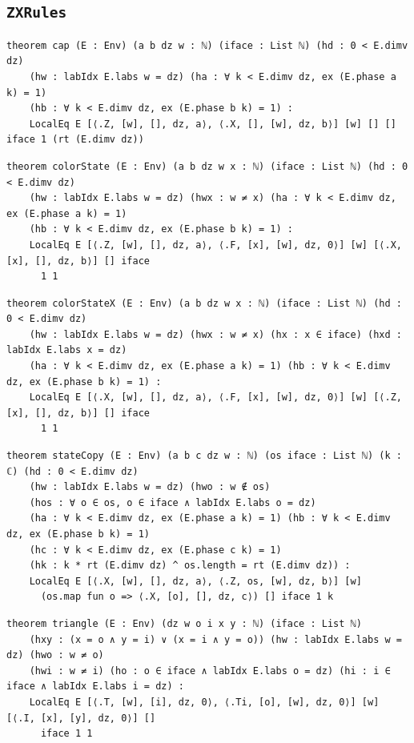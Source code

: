 \subsection{\texttt{ZXRules}}
\begin{lstlisting}[style=leancore]
theorem cap (E : Env) (a b dz w : ℕ) (iface : List ℕ) (hd : 0 < E.dimv dz)
    (hw : labIdx E.labs w = dz) (ha : ∀ k < E.dimv dz, ex (E.phase a k) = 1)
    (hb : ∀ k < E.dimv dz, ex (E.phase b k) = 1) :
    LocalEq E [⟨.Z, [w], [], dz, a⟩, ⟨.X, [], [w], dz, b⟩] [w] [] [] iface 1 (rt (E.dimv dz))
\end{lstlisting}
\begin{lstlisting}[style=leancore]
theorem colorState (E : Env) (a b dz w x : ℕ) (iface : List ℕ) (hd : 0 < E.dimv dz)
    (hw : labIdx E.labs w = dz) (hwx : w ≠ x) (ha : ∀ k < E.dimv dz, ex (E.phase a k) = 1)
    (hb : ∀ k < E.dimv dz, ex (E.phase b k) = 1) :
    LocalEq E [⟨.Z, [w], [], dz, a⟩, ⟨.F, [x], [w], dz, 0⟩] [w] [⟨.X, [x], [], dz, b⟩] [] iface
      1 1
\end{lstlisting}
\begin{lstlisting}[style=leancore]
theorem colorStateX (E : Env) (a b dz w x : ℕ) (iface : List ℕ) (hd : 0 < E.dimv dz)
    (hw : labIdx E.labs w = dz) (hwx : w ≠ x) (hx : x ∈ iface) (hxd : labIdx E.labs x = dz)
    (ha : ∀ k < E.dimv dz, ex (E.phase a k) = 1) (hb : ∀ k < E.dimv dz, ex (E.phase b k) = 1) :
    LocalEq E [⟨.X, [w], [], dz, a⟩, ⟨.F, [x], [w], dz, 0⟩] [w] [⟨.Z, [x], [], dz, b⟩] [] iface
      1 1
\end{lstlisting}
\begin{lstlisting}[style=leancore]
theorem stateCopy (E : Env) (a b c dz w : ℕ) (os iface : List ℕ) (k : ℂ) (hd : 0 < E.dimv dz)
    (hw : labIdx E.labs w = dz) (hwo : w ∉ os)
    (hos : ∀ o ∈ os, o ∈ iface ∧ labIdx E.labs o = dz)
    (ha : ∀ k < E.dimv dz, ex (E.phase a k) = 1) (hb : ∀ k < E.dimv dz, ex (E.phase b k) = 1)
    (hc : ∀ k < E.dimv dz, ex (E.phase c k) = 1)
    (hk : k * rt (E.dimv dz) ^ os.length = rt (E.dimv dz)) :
    LocalEq E [⟨.X, [w], [], dz, a⟩, ⟨.Z, os, [w], dz, b⟩] [w]
      (os.map fun o => ⟨.X, [o], [], dz, c⟩) [] iface 1 k
\end{lstlisting}
\begin{lstlisting}[style=leancore]
theorem triangle (E : Env) (dz w o i x y : ℕ) (iface : List ℕ)
    (hxy : (x = o ∧ y = i) ∨ (x = i ∧ y = o)) (hw : labIdx E.labs w = dz) (hwo : w ≠ o)
    (hwi : w ≠ i) (ho : o ∈ iface ∧ labIdx E.labs o = dz) (hi : i ∈ iface ∧ labIdx E.labs i = dz) :
    LocalEq E [⟨.T, [w], [i], dz, 0⟩, ⟨.Ti, [o], [w], dz, 0⟩] [w] [⟨.I, [x], [y], dz, 0⟩] []
      iface 1 1
\end{lstlisting}
